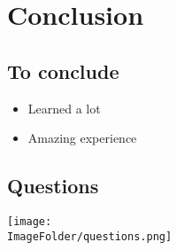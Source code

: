 %
%

\section{Conclusion}

\subsection{To conclude}
\begin{FrameWithSubSection}
    \begin{itemize}
        \item Learned a lot
        \item Amazing experience
    \end{itemize}
\end{FrameWithSubSection}

\subsection{Questions}
\begin{FrameWithSubSection}
    \center
  \texttt{[image: \\ImageFolder/questions.png]}
\end{FrameWithSubSection}
